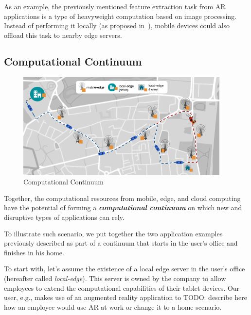 
As an example, the previously mentioned feature extraction task from AR applications is a type of heavyweight computation based on image processing. Instead of performing it locally (as proposed in~\cite{Huang2012}), mobile devices could also offload this task to nearby edge servers. 

\subsection{Computational Continuum}

\begin{figure}[tbp]
	\includegraphics[width=0.95\textwidth]{figs/continuum.png}
	\caption{Computational Continuum}
	\label{fig:developer-control-serverless}
\end{figure}

Together, the computational resources from mobile, edge, and cloud computing have the potential of forming a \textit{\textbf{computational continuum}} on which new and disruptive types of applications can rely. 

To illustrate such scenario, we put together the two application examples previously described as part of a continuum that starts in the user's office and finishes in his home. 

To start with, let's assume the existence of a local edge server in the user's office (hereafter called \textit{local-edge}). This server is owned by the company to allow employees to extend the computational capabilities of their tablet devices. Our user, e.g., makes use of an augmented reality application to TODO: describe here how an employee would use AR at work or change it to a home scenario.

